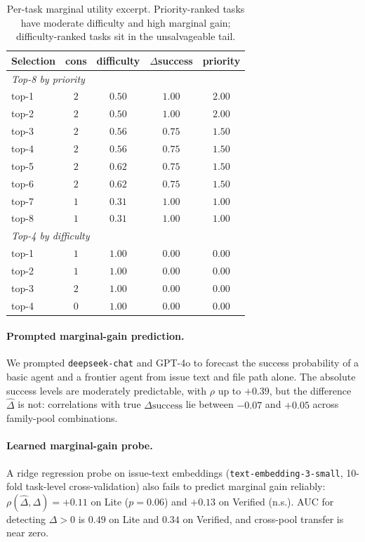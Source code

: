 \documentclass{article}
\begin{document}
\begin{table}[h]
\centering
\caption{Per-task marginal utility excerpt. Priority-ranked tasks have
moderate difficulty and high marginal gain; difficulty-ranked tasks sit
in the unsalvageable tail.}
\label{tab:marg}
\small
\begin{tabular}{lcccc}
\toprule
Selection & cons & difficulty & $\Delta$success & priority \\
\midrule
\multicolumn{5}{l}{\textit{Top-8 by priority}} \\
top-1 & $2$ & $0.50$ & $1.00$ & $2.00$ \\
top-2 & $2$ & $0.50$ & $1.00$ & $2.00$ \\
top-3 & $2$ & $0.56$ & $0.75$ & $1.50$ \\
top-4 & $2$ & $0.56$ & $0.75$ & $1.50$ \\
top-5 & $2$ & $0.62$ & $0.75$ & $1.50$ \\
top-6 & $2$ & $0.62$ & $0.75$ & $1.50$ \\
top-7 & $1$ & $0.31$ & $1.00$ & $1.00$ \\
top-8 & $1$ & $0.31$ & $1.00$ & $1.00$ \\
\midrule
\multicolumn{5}{l}{\textit{Top-4 by difficulty}} \\
top-1 & $1$ & $1.00$ & $0.00$ & $0.00$ \\
top-2 & $1$ & $1.00$ & $0.00$ & $0.00$ \\
top-3 & $2$ & $1.00$ & $0.00$ & $0.00$ \\
top-4 & $0$ & $1.00$ & $0.00$ & $0.00$ \\
\bottomrule
\end{tabular}
\end{table}

\paragraph{Prompted marginal-gain prediction.}
We prompted \texttt{deepseek-chat} and GPT-4o to forecast the success
probability of a basic agent and a frontier agent from issue text and
file path alone. The absolute success levels are moderately
predictable, with $\rho$ up to $+0.39$, but the difference
$\hat{\Delta}$ is not: correlations with true
$\Delta\mathrm{success}$ lie between $-0.07$ and $+0.05$ across
family-pool combinations.

\paragraph{Learned marginal-gain probe.}
A ridge regression probe on issue-text embeddings
(\texttt{text-embedding-3-small}, 10-fold task-level cross-validation)
also fails to predict marginal gain reliably:
$\rho(\hat{\Delta},\Delta)=+0.11$ on Lite ($p=0.06$) and
$+0.13$ on Verified (n.s.). AUC for detecting $\Delta>0$ is $0.49$
on Lite and $0.34$ on Verified, and cross-pool transfer is near zero.
\end{document}
